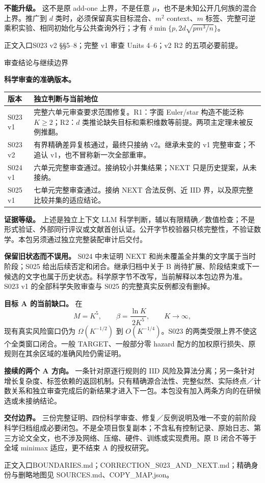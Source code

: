 \documentclass[11pt,a4paper]{article}
\newcommand{\head}[2]{{\small\sffamily #1}\par\vspace{2pt}{\LARGE\bfseries #2}\par\vspace{5pt}}
\newcommand{\entry}[1]{\vfill{\noindent\small\raggedright 正文入口\quad #1\par}}
\begin{document}
\textbf{不能升级。} 这不是原 add-one 上界，不是任意 $\mu$，也不是未知公开几何族的混合上界。推广到 $d$ 类时，必须保留真实目标混合、$m^2$ context、$m$ 标签、完整可逆乘积实验、相同初始化与公共查询外行；才有 $\delta\min\{p,2d\sqrt{pm^3/n}\}$。
\entry{S023 v2 §§5--8；完整 v1 审查 Units 4--6；v2 R2 的五项必要前提。}
\newpage
\head{审查结论与继续边界}{目标 B 已闭合而目标 A 尚未完成}
\textbf{科学审查的准确版本。}
\begin{center}
\begin{tabularx}{\textwidth}{@{}lX@{}}\toprule
版本 & 独立判断与当前地位\\\midrule
S023 v1 & 完整六单元审查要求范围修复。R1：字面 Euler/star 构造不能泛称 $K\ge2$；R2：$d$ 类推论缺失目标和乘积维数等前提。两项主定理未被反例推翻。\\
S023 v2 & 有界精确差异复核通过，最终只接纳 v2。继承未变的 v1 完整审查；不追认 v1，也不冒称新一次全部重审。\\
S024 v1 & 六单元完整审查通过。接纳较小并集结果；NEXT 只是历史提案，从未接纳。\\
S025 v1 & 七单元完整审查通过。接纳 NEXT 合法反例、近 IID 界，以及原完整比较并集的适应结论。\\\bottomrule
\end{tabularx}
\end{center}
\textbf{证据等级。} 上述是独立上下文 LLM 科学判断，辅以有限精确／数值检查；不是形式验证、外部同行评议或文献首创认证。公开字节校验器只核完整性，不验证数学。本包另须通过独立完整装配审计后交付。

\textbf{保留旧状态而不误用。} S024 中未证明 NEXT 和尚未覆盖全并集的文字属于当时阶段；S025 给出后续否定和闭合。继承归档中关于 B 尚待扩展、阶段结束或下一候选的文字也属于历史状态。科学原字节不改写，当前解释以本包边界为准。S023 v1 的全部科学失败审查与 S025 的完整真实反例都没有删掉。

\textbf{目标 A 的当前缺口。} 在
\[
 M=K^5,\qquad \beta=\frac{\ln K}{2K^5},\qquad K\longrightarrow\infty,
\]
现有真实风险窗口仍为 $\Omega(K^{-1/2})$ 到 $O(K^{-1/4})$。S023 的两类受限上界不使这个全类窗口闭合。一般 TARGET、一般部分零 hazard 配方的加权原行损失、原规则在其余区域的准确风险仍需证明。

\textbf{接续的两个 A 方向。} 一条针对原逐行规则的 IID 风险及算法分离；另一条针对增长复杂度、标签依赖的返回机制。只有精确源合法性、完整似然、实际终点／计数关系和独立审查完成后的新结果才进入下一包。本包没有加入两条方向的在研候选或未接纳结论。

\textbf{交付边界。} 三份完整证明、四份科学审查、修复／反例说明及唯一不变的前阶段科学归档组成必要闭包。不是全项目恢复副本；不含私有控制记录、原始日志、第三方论文全文，也不涉及网络、压缩、硬件、训练或实现费用。原 B 闭合不等于全域 minimax 适应，更不结束 A 的授权研究。
\entry{BOUNDARIES.md；CORRECTION\_S023\_AND\_NEXT.md；精确身份与删略地图见 SOURCES.md、COPY\_MAP.json。}
\par\vspace{3pt}{\tiny END\_DOT\_STAGE\_OUTPUT}
\end{document}
